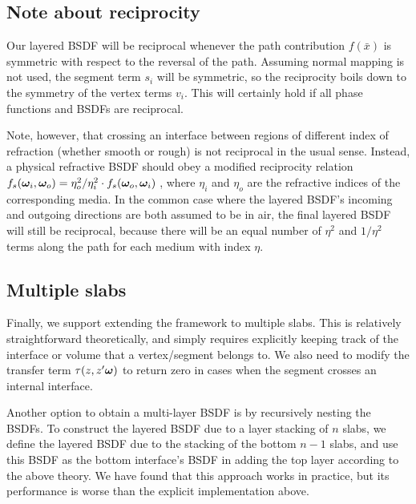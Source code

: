\subsection{Note about reciprocity}

Our layered BSDF will be reciprocal whenever the path contribution $f(\bar x)$ is symmetric with respect to the reversal of the path. Assuming normal mapping is not used, the segment term $s_i$ will be symmetric, so the reciprocity boils down to the symmetry of the vertex terms $v_i$. This will certainly hold if all phase functions and BSDFs are reciprocal.

Note, however, that crossing an interface between regions of different index of refraction (whether smooth or rough) is not reciprocal in the usual sense. Instead, a physical refractive BSDF should obey a modified reciprocity relation $f_s(\bm{\omega}_i, \bm{\omega}_o) = \eta_o^2 / \eta_i^2 \cdot f_s(\bm{\omega}_o, \bm{\omega}_i)$ \cite{Walter:2007:MMR}, where $\eta_i$ and $\eta_o$ are the refractive indices of the corresponding media. In the common case where the layered BSDF's incoming and outgoing directions are both assumed to be in air, the final layered BSDF will still be reciprocal, because there will be an equal number of $\eta^2$ and $1/\eta^2$ terms along the path for each medium with index $\eta$.


\subsection{Multiple slabs}
\label{subsec:multi_layer}

Finally, we support extending the framework to multiple slabs. This is relatively straightforward theoretically, and simply requires explicitly keeping track of the interface or volume that a vertex/segment belongs to. We also need to modify the transfer term $\tau(z,z'\bm{\omega})$ to return zero in cases when the segment crosses an internal interface.

Another option to obtain a multi-layer BSDF is by recursively nesting the BSDFs. To construct the layered BSDF due to a layer stacking of $n$ slabs, we define the layered BSDF due to the stacking of the bottom $n-1$ slabs, and use this BSDF as the bottom interface's BSDF in adding the top layer according to the above theory. We have found that this approach works in practice, but its performance is worse than the explicit implementation above.


